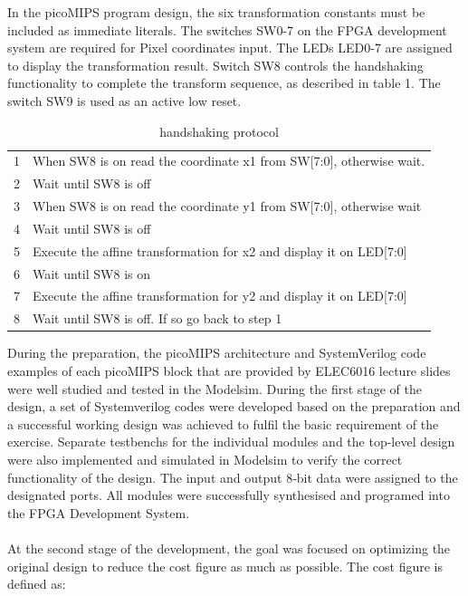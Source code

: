 In the picoMIPS program design, the six transformation constants must be included as immediate literals. The switches SW0-7 on the FPGA development system are required for Pixel coordinates input. The LEDs LED0-7 are assigned to display the transformation result. Switch SW8 controls the handshaking functionality to complete the transform sequence, as described in table 1. The switch SW9 is used as an active low reset.
\begin{table}[H]
\centering %
\begin{tabular}{ll}
\hline
1 & When SW8 is on read the coordinate x1 from SW{[}7:0{]}, otherwise wait. \\ 
2 & Wait until SW8 is off                                                   \\
3 & When SW8 is on read the coordinate y1 from SW{[}7:0{]}, otherwise wait  \\
4 & Wait until SW8 is off                                                   \\
5 & Execute the affine transformation for x2 and display it on LED{[}7:0{]}        \\
6 & Wait until SW8 is on                                                    \\
7 & Execute the affine transformation for y2 and display it on LED{[}7:0{]}                                              \\
8 & Wait until SW8 is off. If so go back to step 1                          \\ \hline
\end{tabular}
\caption{handshaking protocol} %
\end{table}
During the preparation, the picoMIPS architecture and SystemVerilog code examples of each picoMIPS block that are provided by ELEC6016 lecture slides were well studied and tested in the Modelsim. During the first stage of the design, a set of Systemverilog codes were developed based on the preparation and a successful working design was achieved to fulfil the basic requirement of the exercise. Separate testbenchs for the individual modules and the top-level design were also implemented and simulated in Modelsim to verify the correct functionality of the design. The input and output 8‐bit data were assigned to the designated ports. All modules were successfully synthesised and programed into the FPGA Development System. \\\\
At the second stage of the development, the goal was focused on optimizing the original design to reduce the cost figure as much as possible. The cost figure is defined as:\\\\
